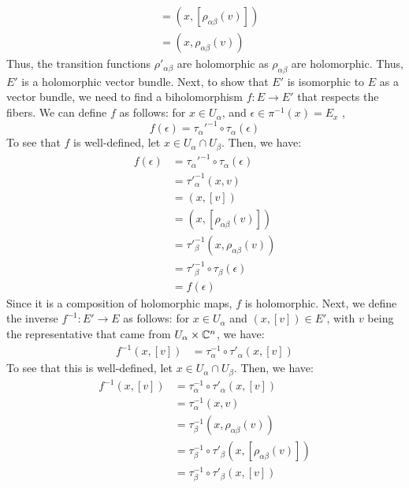 \documentclass[12pt]{article}
\begin{document}
\begin{solution}
\begin{enumerate}
\begin{align*}
            &= (x, [\rho_{\alpha\beta}(v)])  \\
            &= (x, \rho_{\alpha\beta}(v))         
        \end{align*}
        Thus, the transition functions $\rho'_{\alpha\beta}$ are holomorphic as $\rho_{\alpha\beta}$ are holomorphic. Thus, $E'$ is a holomorphic vector bundle. \bbni
        Next, to show that $E'$ is isomorphic to $E$ as a vector bundle, we need to find a biholomorphism $f: E \to E'$ that respects the fibers. We can define $f$ as follows: for $x \in U_\alpha$, and $\epsilon \in \pi^{-1}(x) = E_x$ , 
        \[ f(\epsilon) = \tau_\alpha'^{-1} \circ \tau_\alpha(\epsilon)\]
        To see that $f$ is well-defined, let $x \in U_\alpha \cap U_\beta$. Then, we have: 
        \begin{align*}
            f(\epsilon) &= \tau_\alpha'^{-1} \circ \tau_\alpha(\epsilon) \\
            &= \tau'^{-1}_\alpha(x, v) \\
            &= (x, [v]) \\
            &= (x, [\rho_{\alpha\beta}(v)]) \\
            &= \tau'^{-1}_\beta(x, \rho_{\alpha\beta}(v)) \\
            &= \tau'^{-1}_\beta \circ \tau_{\beta}(\epsilon) \\
            &= f(\epsilon)
        \end{align*}
        Since it is a composition of holomorphic maps, $f$ is holomorphic. Next, we define the inverse $f^{-1}: E' \to E$ as follows: for $x \in U_\alpha$ and $(x, [v]) \in E'$, with $v$ being the representative that came from $U_\alpha \times \mathbb C^n$, we have: 
        \begin{align*}
            f^{-1}(x, [v]) &= \tau^{-1}_\alpha \circ \tau'_\alpha(x, [v]) 
        \end{align*}
        To see that this is well-defined, let $x \in U_\alpha \cap U_\beta$. Then, we have:
        \begin{align*}
            f^{-1}(x, [v]) &= \tau^{-1}_\alpha \circ \tau'_\alpha(x, [v]) \\
            &= \tau^{-1}_\alpha(x, v) \\
            &= \tau_\beta^{-1}(x, \rho_{\alpha\beta}(v)) \\
            &= \tau_\beta^{-1} \circ \tau'_\beta(x, [\rho_{\alpha\beta}(v)]) \\
            &= \tau_\beta^{-1} \circ \tau'_\beta(x, [v]) \\

\end{align*}
\end{enumerate}
\end{solution}
\end{document}
